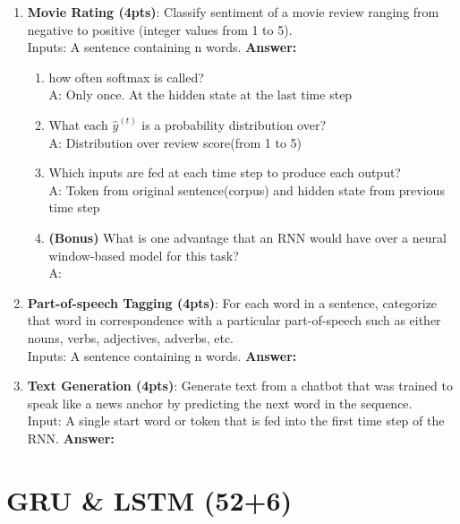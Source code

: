 \documentclass{assignment format}
\newenvironment{answer}{
    {\bf Answer:} \begingroup\color{red}
}{\endgroup}%
\begin{document}
\begin{enumerate}[label=(\alph*)]
    \item \textbf{Movie Rating (4pts)}: Classify sentiment of a movie review ranging from negative to positive (integer values from 1 to 5).\\Inputs: A sentence
    containing n words.
    \begin{answer}
    \begin{enumerate}
        \item how often softmax is called? \\
        A: Only once. At the hidden state at the last time step 
        \item What each $\hat{y}^{(t)}$ is a probability distribution over? \\
        A: Distribution over review score(from 1 to 5)
        \item Which inputs are fed at each time step to produce each output? \\
        A: Token from original sentence(corpus) and hidden state from previous time step
        \item \textbf{(Bonus) }What is one advantage that an RNN would have over a neural window-based model for this task? \\
        A: 
    \end{enumerate}
    \end{answer}
    \item \textbf{Part-of-speech Tagging (4pts)}: For each word in a sentence, categorize that word in correspondence with a particular part-of-speech such as either nouns, verbs, adjectives, adverbs, etc.\\Inputs: A sentence containing n words.
    \begin{answer}
    \end{answer}
    \item \textbf{Text Generation (4pts)}: Generate text from a chatbot that was trained to speak like a news anchor by predicting the next word in the sequence. \\Input: A single start word or token that is fed into the first time step of the RNN.
    \begin{answer}
    \end{answer}
    \end{enumerate}
    

    
    

\section{GRU \& LSTM (52+6)}
\end{document}

